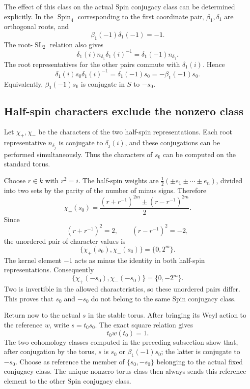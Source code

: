 \documentclass[11pt,a4paper]{article}
\theoremstyle{definition}
\theoremstyle{remark}
\begin{document}
The effect of this class on the actual Spin conjugacy class can be
determined explicitly. In the \(\operatorname{Spin}_4\) corresponding
to the first coordinate pair, \(\beta_1,\delta_1\) are orthogonal
roots, and
\[
\beta_1(-1)\delta_1(-1)=-1.
\]
The root-\(\operatorname{SL}_2\) relation also gives
\[
\delta_1(i)n_{\delta_1}\delta_1(i)^{-1}
=\delta_1(-1)n_{\delta_1}.
\]
The root representatives for the other pairs commute with
\(\delta_1(i)\). Hence
\[
\delta_1(i)s_0\delta_1(i)^{-1}
=\delta_1(-1)s_0
=-\beta_1(-1)s_0.
\]
Equivalently, \(\beta_1(-1)s_0\) is conjugate in \(S\) to \(-s_0\).

\subsection{Half-spin characters exclude the nonzero class}
\label{subsec:even-d-half-spin-characters}

Let \(\chi_+,\chi_-\) be the characters of the two half-spin
representations. Each root representative \(n_{\delta_j}\) is
conjugate to \(\delta_j(i)\), and these conjugations can be performed
simultaneously. Thus the characters of \(s_0\) can be computed on the
standard torus.

Choose \(r\in k\) with \(r^2=i\). The half-spin weights are
\(\frac12(\pm e_1\pm\cdots\pm e_n)\), divided into two sets by the
parity of the number of minus signs. Therefore
\[
\chi_\pm(s_0)=
\frac{(r+r^{-1})^{2m}\pm(r-r^{-1})^{2m}}2.
\]
Since
\[
(r+r^{-1})^2=2,\qquad
(r-r^{-1})^2=-2,
\]
the unordered pair of character values is
\[
\{\chi_+(s_0),\chi_-(s_0)\}=\{0,2^m\}.
\]
The kernel element \(-1\) acts as minus the identity in both half-spin
representations. Consequently
\[
\{\chi_+(-s_0),\chi_-(-s_0)\}=\{0,-2^m\}.
\]
Two is invertible in the allowed characteristics, so these unordered
pairs differ. This proves that \(s_0\) and \(-s_0\) do not belong to
the same Spin conjugacy class.

Return now to the actual \(s\) in the stable torus. After bringing its
Weyl action to the reference \(w\), write \(s=t_0s_0\). The exact
square relation gives
\[
t_0w(t_0)=1.
\]
The two cohomology classes computed in the preceding subsection show
that, after conjugation by the torus, \(s\) is \(s_0\) or
\(\beta_1(-1)s_0\); the latter is conjugate to \(-s_0\). Choose as
reference the member of \(\{s_0,-s_0\}\) belonging to the actual fixed
conjugacy class. The unique nonzero torus class then always sends this
reference element to the other Spin conjugacy class.
\end{document}
